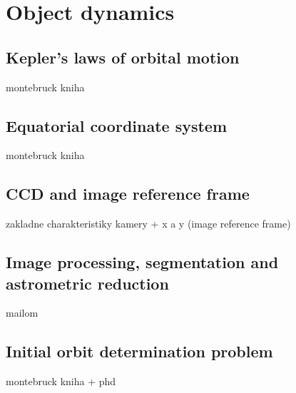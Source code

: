 \chapter{Object dynamics}\label{chap:object_dynamics}

\section{Kepler's laws of orbital motion}\label{sec:kepler}
montebruck kniha

\section{Equatorial coordinate system}\label{sec:ra_dec}
montebruck kniha

\section{CCD and image reference frame}\label{sec:ccd}
zakladne charakteristiky kamery + x a y (image reference frame)

\section{Image processing, segmentation and astrometric reduction}\label{sec:proc_seg_reduc}
mailom

\section{Initial orbit determination problem}\label{sec:init_orbit_det}
montebruck kniha + phd